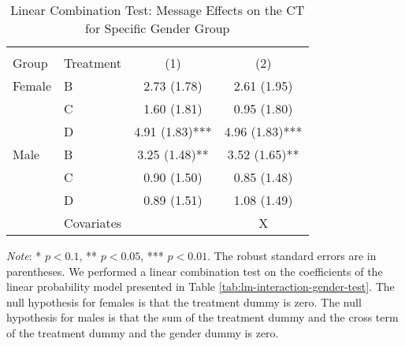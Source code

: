 \documentclass[12pt, a4paper]{article}
\begin{document}
\begin{table}[H]

\caption{\label{tab:lh-interaction-gender-test}Linear Combination Test: Message Effects on the CT for Specific Gender Group}
\centering
\fontsize{8}{10}\selectfont
\begin{threeparttable}
\begin{tabular}[t]{>{\raggedright\arraybackslash}p{8em}>{\raggedright\arraybackslash}p{8em}cc}
\toprule
\multicolumn{2}{c}{ } & \multicolumn{2}{c}{CT} \\
\cmidrule(l{3pt}r{3pt}){3-4}
Group & Treatment & (1) & (2)\\
\midrule
Female & B & 2.73 (1.78) & 2.61 (1.95)\\
 & C & 1.60 (1.81) & 0.95 (1.80)\\
 & D & 4.91 (1.83)*** & 4.96 (1.83)***\\
Male & B & 3.25 (1.48)** & 3.52 (1.65)**\\
 & C & 0.90 (1.50) & 0.85 (1.48)\\
 & D & 0.89 (1.51) & 1.08 (1.49)\\
\midrule
 & Covariates &  & X\\
\bottomrule
\end{tabular}
\begin{tablenotes}
\item \emph{Note}: * $p < 0.1$, ** $p < 0.05$, *** $p < 0.01$. The robust standard errors are in parentheses. We performed a linear combination test on the coefficients of the linear probability model presented in Table \ref{tab:lm-interaction-gender-test}. The null hypothesis for females is that the treatment dummy is zero. The null hypothesis for males is that the sum of the treatment dummy and the cross term of the treatment dummy and the gender dummy is zero.
\end{tablenotes}
\end{threeparttable}
\end{table}
\end{document}
